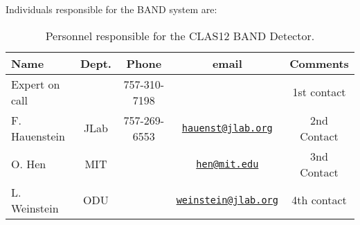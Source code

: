 Individuals responsible for the BAND system are:

\begin{table}[!htb]
 \centering
 \begin{tabular}{|l|c|c|c|c|}
\hline
 Name           & Dept.    & Phone        & email                    & Comments \\ \hline
Expert on call  &          & 757-310-7198 &                          & 1st contact \\ \hline
F. Hauenstein   & JLab     & 757-269-6553 & \href{mailto:hauenst@jlab.org}{\nolinkurl{hauenst@jlab.org}}     & 2nd Contact \\ \hline
O. Hen          & MIT      &              & \href{mailto:hen@mit.edu}{\nolinkurl{hen@mit.edu}}               & 3nd Contact \\ \hline
L. Weinstein    & ODU      &              & \href{mailto:weinstein@jlab.org}{\nolinkurl{weinstein@jlab.org}} & 4th contact  \\ \hline
 \end{tabular}
\caption{Personnel responsible for the CLAS12 BAND Detector.} 
\label{tb:band}
\end{table}
